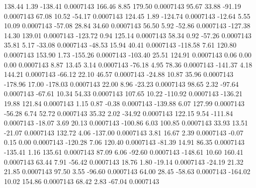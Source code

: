       138.44        1.39     -138.41     0.0007143
      166.46        8.85      179.50     0.0007143
       95.67       33.88      -91.19     0.0007143
       67.08       10.52      -54.17     0.0007143
      124.45        1.89     -124.74     0.0007143
      -12.64        5.55       10.09     0.0007143
      -57.08       28.84       34.60     0.0007143
       56.50        5.92      -52.86     0.0007143
     -127.38       14.30      139.01     0.0007143
     -123.72        0.94      125.14     0.0007143
       58.34        0.92      -57.26     0.0007143
       35.81        5.17      -33.08     0.0007143
      -48.53       15.94       40.41     0.0007143
     -118.58        7.61      120.80     0.0007143
      153.90        1.73     -155.26     0.0007143
     -103.40       25.51      124.91     0.0007143
        0.06        0.00        0.00     0.0007143
        8.87       13.45        3.14     0.0007143
      -76.18        4.95       78.36     0.0007143
     -141.37        4.18      144.21     0.0007143
      -66.12       22.10       46.57     0.0007143
      -24.88       10.87       35.96     0.0007143
     -178.96       17.00     -178.03     0.0007143
       22.00        8.96      -23.23     0.0007143
       98.65        2.32      -97.64     0.0007143
      -67.61       10.34       54.33     0.0007143
      107.65       10.22     -110.92     0.0007143
     -136.21       19.88      121.84     0.0007143
        1.15        0.87       -0.38     0.0007143
     -139.88        6.07      127.99     0.0007143
      -56.28        6.74       52.72     0.0007143
       35.32        2.02      -34.92     0.0007143
      122.15        9.54     -111.84     0.0007143
      -18.07        3.69       20.13     0.0007143
     -100.86        6.03      100.85     0.0007143
       33.93       13.51      -21.07     0.0007143
      132.72        4.06     -137.00     0.0007143
        3.81       16.67        2.39     0.0007143
       -0.07        0.15        0.00     0.0007143
     -120.28        7.06      120.40     0.0007143
      -81.39       14.91       86.35     0.0007143
     -135.41        1.16      135.61     0.0007143
       87.09        6.06      -92.60     0.0007143
     -148.61       10.60      160.41     0.0007143
       63.44        7.91      -56.42     0.0007143
       18.76        1.80      -19.14     0.0007143
      -24.19       21.32       21.85     0.0007143
       97.50        3.55      -96.60     0.0007143
       64.00       28.45      -58.63     0.0007143
     -164.02       10.02      154.86     0.0007143
       68.42        2.83      -67.04     0.0007143
